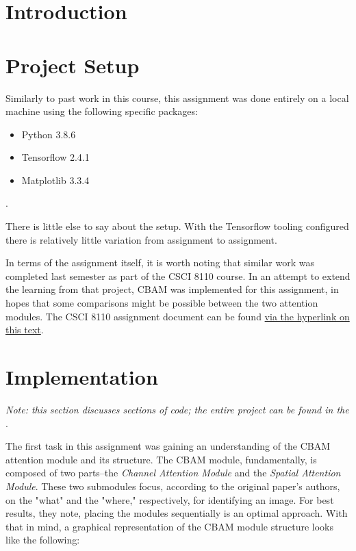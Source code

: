 \documentclass{article}
\begin{document}
  
  \graphicspath{{./images/}}
\section{Introduction}



\section{Project Setup} \label{setup}
Similarly to past work in this course, this assignment was done entirely on a local machine using the following specific packages:
\begin{itemize}
    \item Python 3.8.6 
    \item Tensorflow 2.4.1
    \item Matplotlib 3.3.4
\end{itemize}.

There is little else to say about the setup. With the Tensorflow tooling configured there is relatively little variation from assignment to assignment. 

In terms of the assignment itself, it is worth noting that similar work was completed last semester as part of the CSCI 8110 course.
In an attempt to extend the learning from that project, CBAM was implemented for this assignment, in hopes that some comparisons might be possible between the two attention modules.
The CSCI 8110 assignment document can be found \href{https://keybase.pub/pdav/academics/8110\%20Reports/Davlin_HW3_V2.pdf}{via the hyperlink on this text}.

\section{Implementation} \label{impl}
\textit{Note: this section discusses sections of code; the entire project can be found in the }.

The first task in this assignment was gaining an understanding of the CBAM attention module and its structure.
The CBAM module, fundamentally, is composed of two parts--the \textit{Channel Attention Module} and the \textit{Spatial Attention Module}.
These two submodules focus, according to the original paper's authors, on the "what" and the "where," respectively, for identifying an image.
For best results, they note, placing the modules sequentially is an optimal approach.
With that in mind, a graphical representation of the CBAM module structure looks like the following: 
\end{document}
